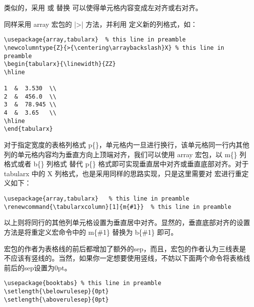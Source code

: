 类似的，采用  或
 替换 可以使得单元格内容变成左对齐或右对齐。



同样采用 array 宏包的 |>| 方法，并利用
 定义新的列格式，如：

\begin{verbatim}
\usepackage{array,tabularx}  % this line in preamble
\newcolumntype{Z}{>{\centering\arraybackslash}X} % this line in preamble
\begin{tabularx}{\linewidth}{ZZ}
\hline

1  &  3.530  \\
2  &  456.0  \\
3  &  78.945 \\
4  &  3.65   \\
\hline
\end{tabularx}
\end{verbatim}



对于指定宽度的表格列格式
p\{\}，单元格内一旦进行换行，该单元格同一行内其他列的单元格内容均为垂直方向上顶端对齐，我们可以使用
array 宏包，以 m\{\} 列格式或者 b\{\} 列格式 替代 p\{\}
格式即可实现垂直居中对齐或垂直底部对齐。对于 tabularx 中的 X
列格式，也是采用同样的思路实现，只是这里需要对
 宏进行重定义如下：

\begin{verbatim}
\usepackage{array,tabularx}   % this line in preamble
\renewcommand{\tabularxcolumn}[1]{m{#1}}  % this line in preamble
\end{verbatim}

以上则将同行的其他列单元格设置为垂直居中对齐。显然的，垂直底部对齐的设置方法是将重定义宏命令中的
m\{\#1\} 替换为 b\{\#1\} 即可。



宏包的作者为表格线的前后都增加了额外的sep，而且，宏包的作者认为三线表是不应该有竖线的。当然，如果你一定想要使用竖线，不妨以下面两个命令将表格线前后的sep设置为0pt。

\begin{verbatim}
\usepackage{booktabs} % this line in preamble
\setlength{\belowrulesep}{0pt}
\setlength{\aboverulesep}{0pt}
\end{verbatim}



